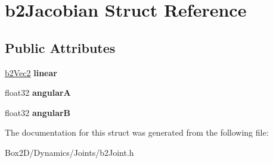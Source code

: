 \hypertarget{structb2_jacobian}{}\section{b2\+Jacobian Struct Reference}
\label{structb2_jacobian}
\subsection*{Public Attributes}
\begin{DoxyCompactItemize}
\item 
\mbox{\label{structb2_jacobian_aa63199b443d411972b9cb6aac6c7cb34}} 
\hyperlink{structb2_vec2}{b2\+Vec2} {\bfseries linear}
\item 
\mbox{\label{structb2_jacobian_a0669f849afcdc154b36f86cb0529d2bc}} 
float32 {\bfseries angularA}
\item 
\mbox{\label{structb2_jacobian_a3bbdbd8e46f4fa9be2e50434edaaeb14}} 
float32 {\bfseries angularB}
\end{DoxyCompactItemize}


The documentation for this struct was generated from the following file\+:\begin{DoxyCompactItemize}
\item 
Box2\+D/\+Dynamics/\+Joints/b2\+Joint.\+h\end{DoxyCompactItemize}
